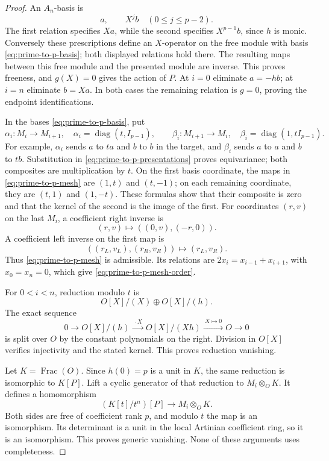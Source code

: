 \begin{proof}
An \(A_n\)-basis is
\begin{equation}\label{eq:prime-to-p-basis}
 a,\qquad X^j b\quad(0\le j\le p-2).
\end{equation}
The first relation specifies \(Xa\), while the second specifies
\(X^{p-1}b\), since \(h\) is monic.  Conversely these prescriptions
define an \(X\)-operator on the free module with basis
\eqref{eq:prime-to-p-basis}; both displayed relations hold there.
The resulting maps between this free module and the presented module
are inverse.  This proves freeness, and \(g(X)=0\) gives the action
of \(P\).  At \(i=0\) eliminate \(a=-hb\); at \(i=n\) eliminate
\(b=Xa\).  In both cases the remaining relation is \(g=0\), proving
the endpoint identifications.

In the bases \eqref{eq:prime-to-p-basis}, put
\[
 \alpha_i:M_i\longrightarrow M_{i+1},\quad
 \alpha_i=\operatorname{diag}(t,I_{p-1}),\qquad
 \beta_i:M_{i+1}\longrightarrow M_i,\quad
 \beta_i=\operatorname{diag}(1,tI_{p-1}).
\]
For example, \(\alpha_i\) sends \(a\) to \(ta\) and \(b\) to \(b\)
in the target, and \(\beta_i\) sends \(a\) to \(a\) and \(b\) to
\(tb\).  Substitution in \eqref{eq:prime-to-p-presentations}
proves equivariance; both composites are multiplication by \(t\).
On the first basis coordinate, the maps in
\eqref{eq:prime-to-p-mesh} are \((1,t)\) and \((t,-1)\);
on each remaining coordinate, they are \((t,1)\) and \((1,-t)\).
These formulas show that their composite is zero and that the kernel
of the second is the image of the first.  For coordinates \((r,v)\)
on the last \(M_i\), a coefficient right inverse is
\[
 (r,v)\longmapsto ((0,v),(-r,0)).
\]
A coefficient left inverse on the first map is
\[
 ((r_L,v_L),(r_R,v_R))\longmapsto(r_L,v_R).
\]
Thus \eqref{eq:prime-to-p-mesh} is admissible.  Its relations are
\(2x_i=x_{i-1}+x_{i+1}\), with \(x_0=x_n=0\), which give
\eqref{eq:prime-to-p-mesh-order}.

For \(0<i<n\), reduction modulo \(t\) is
\[
 O[X]/(X)\oplus O[X]/(h).
\]
The exact sequence
\begin{equation}\label{eq:prime-to-p-reduction}
 0\longrightarrow O[X]/(h)
  \xrightarrow{\ \cdot X\ } O[X]/(Xh)
  \xrightarrow{\ X\mapsto0\ }O\longrightarrow0
\end{equation}
is split over \(O\) by the constant polynomials on the right.
Division in \(O[X]\) verifies injectivity and the stated kernel.
This proves reduction vanishing.

Let \(K=\operatorname{Frac}(O)\).  Since \(h(0)=p\) is a unit in
\(K\), the same reduction is isomorphic to \(K[P]\).
Lift a cyclic generator of that reduction to \(M_i\otimes_OK\).
It defines a homomorphism
\[
 (K[t]/t^n)[P]\longrightarrow M_i\otimes_OK.
\]
Both sides are free of coefficient rank \(p\), and modulo \(t\)
the map is an isomorphism.  Its determinant is a unit in the local
Artinian coefficient ring, so it is an isomorphism.  This proves
generic vanishing.  None of these arguments uses completeness.
\end{proof}

